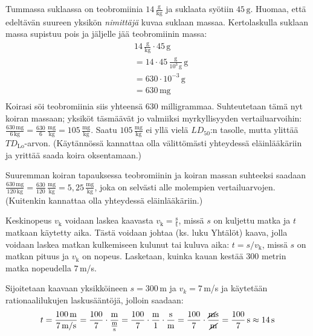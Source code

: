 \begin{esimerkki}
\begin{esimratk}
	Tummassa suklaassa on teobromiinia $14\,\frac{\text{g}}{\text{kg}}$ ja suklaata syötiin $45\,\text{g}$. Huomaa, että edeltävän suureen yksikön \textit{nimittäjä} kuvaa suklaan massaa. Kertolaskulla suklaan massa supistuu pois ja jäljelle jää teobromiinin massa:
	\begin{align*}
	& 14\,\frac{\text{g}}{\text{kg}}\cdot 45\,\text{g} \\
	&= 14\cdot 45\,\frac{\text{g}}{10^3\,\text{g}}\,\text{g} \\
	&= 630\cdot10^{-3}\,\text{g} \\
	&= 630\,\text{mg} \\
	\end{align*}
	Koirasi söi teobromiinia siis yhteensä $630$ milligrammaa. Suhteutetaan tämä nyt koiran massaan; yksiköt täsmäävät jo valmiiksi myrkyllisyyden vertailuarvoihin: $\frac{630\,\text{mg}}{6\,\text{kg}}=\frac{630}{6}\,\frac{\text{mg}}{\text{kg}}=105\,\frac{\text{mg}}{\text{kg}}$. Saatu $105\,\frac{\text{mg}}{\text{kg}}$ ei yllä vielä $LD_{50}$:n tasolle, mutta ylittää $T\!D_\text{Lo}$-arvon. (Käytännössä kannattaa olla välittömästi yhteydessä eläinlääkäriin ja yrittää saada koira oksentamaan.)
	
	Suuremman koiran tapauksessa teobromiinin ja koiran massan suhteeksi saadaan $\frac{630\,\text{mg}}{120\,\text{kg}}=\frac{630}{120}\,\frac{\text{mg}}{\text{kg}}=5,25\,\frac{\text{mg}}{\text{kg}}$, joka on selvästi alle molempien vertailuarvojen. (Kuitenkin kannattaa olla yhteydessä eläinlääkäriin.)
	\end{esimratk}
\end{esimerkki}


\begin{esimerkki}
Keskinopeus $v_\mathrm{k}$ voidaan laskea kaavasta $v_\mathrm{k}=\frac{\text{s}}{\text{t}}$, missä $s$ on kuljettu matka ja $t$ matkaan käytetty aika. Tästä voidaan johtaa (ks. luku Yhtälöt) kaava, jolla voidaan laskea matkan kulkemiseen kulunut tai kuluva aika: $t=s/v_\mathrm{k}$, missä $s$ on matkan pituus ja $v_\mathrm{k}$ on nopeus. Lasketaan, kuinka kauan kestää $300$ metrin matka nopeudella $7$\,m/s.

Sijoitetaan kaavaan yksikköineen $s=300$\,m ja $v_k= 7$\,m/s ja käytetään rationaalilukujen laskusääntöjä, jolloin saadaan:
\[t=\frac{100\,\textrm{m}}{7\,\textrm{m/s}} = \frac{100}{7} \cdot \frac{\textrm{m}}{\frac{\textrm{m}}{\textrm{s}}} 
= \frac{100}{7} \cdot \frac{\textrm{m}}{1} \cdot \frac{\textrm{s}}{\textrm{m}}
= \frac{100}{7} \cdot \frac{\cancel{\textrm{m}}\textrm{s}}{\cancel{\textrm{m}}}
=\frac{100}{7}\,\textrm{s} \approx 14\,\textrm{s}\]
\end{esimerkki}

